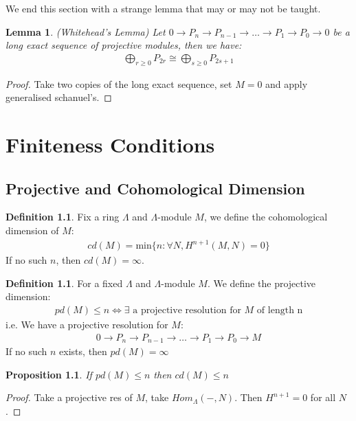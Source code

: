 \documentclass[12pt]{book}
\newtheorem{lemma}[theorem]{Lemma}
\newtheorem{proposition}[theorem]{Proposition}
\theoremstyle{definition}
\newtheorem{definition}[theorem]{Definition}
\begin{document}
We end this section with a strange lemma that may or may not be taught. 

\begin{lemma}
(Whitehead's Lemma) Let $0 \rightarrow P_n \rightarrow P_{n-1} \rightarrow \dots \rightarrow P_1 \rightarrow P_0 \rightarrow 0$ be a long exact sequence of projective modules, then we have: 
\begin{align*}
    \bigoplus_{r \geq 0} P_{2r} \cong \bigoplus_{s \geq 0} P_{2s+1}
\end{align*}
\end{lemma}
\begin{proof}
    Take two copies of the long exact sequence, set $M = 0$ and apply generalised schanuel's. 
\end{proof}

\chapter{Finiteness Conditions}
\section{Projective and Cohomological Dimension}
\begin{definition}
    Fix a ring $\Lambda$ and $\Lambda$-module $M$, we define the cohomological dimension of $M$: 
    \begin{align*}
        cd(M) = \text{min}\{n : \forall N, H^{n+1}(M,N) = 0\}
    \end{align*}
    If no such $n$, then $cd(M) = \infty$.    
\end{definition}

\begin{definition}
    For a fixed $\Lambda$ and $\Lambda$-module $M$. We define the projective dimension: 
    \begin{align*}
        pd(M) \leq n \iff \exists \text{ a projective resolution for $M$ of length n}
    \end{align*}
    i.e. We have a projective resolution for $M$: 
    \begin{align*}
        0 \rightarrow P_n \rightarrow P_{n-1} \rightarrow \dots \rightarrow P_1 \rightarrow P_0 \rightarrow M
    \end{align*}
    If no such $n$ exists, then $pd(M) = \infty$
\end{definition}

\begin{proposition}
    If $pd(M) \leq n$ then $cd(M) \leq n$
\end{proposition}
\begin{proof}
    Take a projective res of $M$, take $Hom_\Lambda(-,N)$. Then $H^{n+1} = 0$ for all $N$. 
\end{proof}
\end{document}
